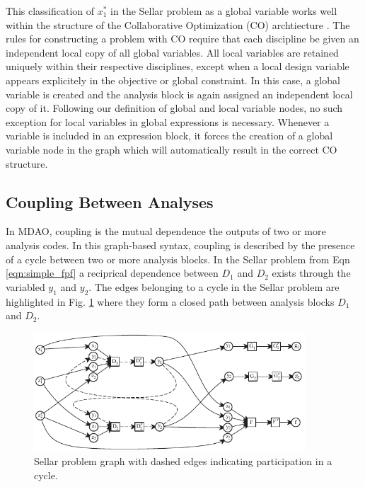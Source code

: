   This classification of $x_1^*$ in the Sellar problem
  as a global variable works well within the structure of the Collaborative 
  Optimization (CO) archtiecture \cite{braun1996thesis}. The rules for constructing 
  a problem with CO require that each discipline be given an independent local 
  copy of all global variables. All local variables are retained uniquely 
  within their respective disciplines, except when a local design variable appears 
  explicitely in the objective or global constraint. In this case, a global 
  variable is created and the analysis block is again assigned an 
  independent local copy of it. Following our definition of global and local variable 
  nodes, no such exception for local variables in global expressions is 
  necessary. Whenever a variable is included in an expression block, 
  it forces the creation of a global variable node in the graph which will 
  automatically result in the correct CO structure.

  

\subsection{Coupling Between Analyses}
  In MDAO, coupling is the mutual dependence the outputs of two or more analysis 
  codes. In this graph-based syntax, coupling is described by the presence of a 
  cycle between two or more analysis blocks. In the Sellar problem from Eqn \ref{eqn:simple_fpf} 
  a reciprical dependence between $D_1$ and $D_2$ exists through the variabled $y_1$ and $y_2$. 
  The edges belonging to a cycle in the Sellar problem are highlighted in 
  Fig. \ref{f:sellar cycles} where they form a closed path between analysis blocks $D_1$ and $D_2$.

  \begin{figure}[htb!]
    \begin{center}
      \includegraphics[width=4.0in]{images/sellar_cycles}
    \end{center}
    \caption{Sellar problem graph with dashed edges indicating participation in a cycle.
    \label{f:sellar cycles}
    }
  \end{figure} 

